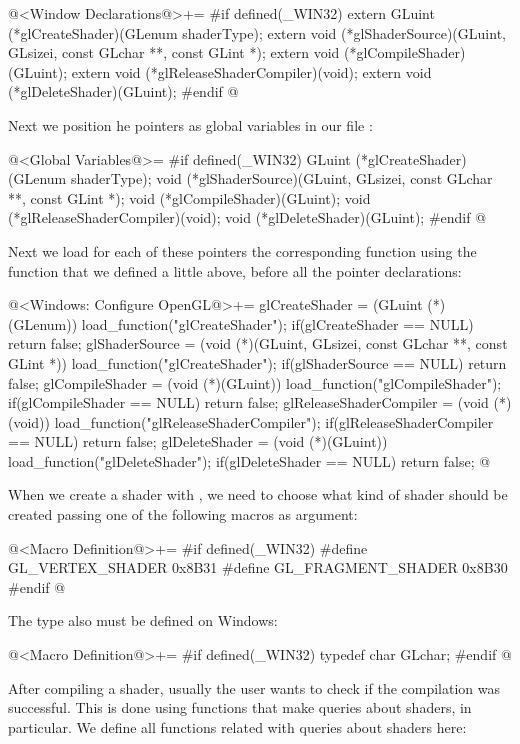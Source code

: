 \iniciocodigo
@<Window Declarations@>+=
#if defined(_WIN32)
extern GLuint (*glCreateShader)(GLenum shaderType);
extern void (*glShaderSource)(GLuint, GLsizei, const GLchar **, const GLint *);
extern void (*glCompileShader)(GLuint);
extern void (*glReleaseShaderCompiler)(void);
extern void (*glDeleteShader)(GLuint);
#endif
@
\fimcodigo

Next we position he pointers as global variables in our
file :

\iniciocodigo
@<Global Variables@>=
#if defined(_WIN32)
GLuint (*glCreateShader)(GLenum shaderType);
void (*glShaderSource)(GLuint, GLsizei, const GLchar **, const GLint *);
void (*glCompileShader)(GLuint);
void (*glReleaseShaderCompiler)(void);
void (*glDeleteShader)(GLuint);
#endif
@
\fimcodigo

Next we load for each of these pointers the corresponding function
using the function that we defined a little above, before all the
pointer declarations:

\iniciocodigo
@<Windows: Configure OpenGL@>+=
glCreateShader = (GLuint (*)(GLenum)) load_function("glCreateShader");
if(glCreateShader == NULL)
  return false;
glShaderSource = (void (*)(GLuint, GLsizei, const GLchar **, const GLint *))
                    load_function("glCreateShader");
if(glShaderSource == NULL)
  return false;
glCompileShader = (void (*)(GLuint)) load_function("glCompileShader");
if(glCompileShader == NULL)
  return false;
glReleaseShaderCompiler = (void (*)(void))
                             load_function("glReleaseShaderCompiler");
if(glReleaseShaderCompiler == NULL)
  return false;
glDeleteShader = (void (*)(GLuint)) load_function("glDeleteShader");
if(glDeleteShader == NULL)
  return false;
@
\fimcodigo

When we create a shader with , we need to
choose what kind of shader should be created passing one of the
following macros as argument:

\iniciocodigo
@<Macro Definition@>+=
#if defined(_WIN32)
#define GL_VERTEX_SHADER          0x8B31
#define GL_FRAGMENT_SHADER        0x8B30
#endif
@
\fimcodigo

The type  also must be defined on Windows:

\iniciocodigo
@<Macro Definition@>+=
#if defined(_WIN32)
typedef char GLchar;
#endif
@
\fimcodigo


After compiling a shader, usually the user wants to check if the
compilation was successful. This is done using functions that make
queries about shaders,  in particular. We
define all functions related with queries about shaders here:

